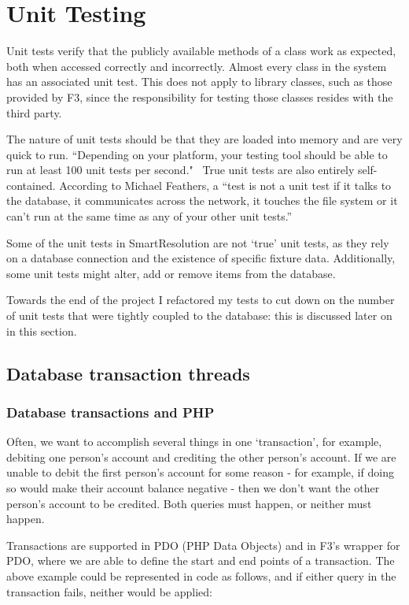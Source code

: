 \section{Unit Testing}

Unit tests verify that the publicly available methods of a class work as expected, both when accessed correctly and incorrectly. Almost every class in the system has an associated unit test. This does not apply to library classes, such as those provided by F3, since the responsibility for testing those classes resides with the third party.

The nature of unit tests should be that they are loaded into memory and are very quick to run. ``Depending on your platform, your testing tool should be able to run at least 100 unit tests per second."~\cite{artOfAgile} True unit tests are also entirely self-contained. According to Michael Feathers, a ``test is not a unit test if it talks to the database, it communicates across the network, it touches the file system or it can't run at the same time as any of your other unit tests.''~\cite{feathers:unitTests}

Some of the unit tests in SmartResolution are not `true' unit tests, as they rely on a database connection and the existence of specific fixture data. Additionally, some unit tests might alter, add or remove items from the database.

Towards the end of the project I refactored my tests to cut down on the number of unit tests that were tightly coupled to the database: this is discussed later on in this section.

\subsection{Database transaction threads}

\subsubsection{Database transactions and PHP}

Often, we want to accomplish several things in one `transaction', for example, debiting one person's account and crediting the other person's account. If we are unable to debit the first person's account for some reason - for example, if doing so would make their account balance negative - then we don't want the other person's account to be credited. Both queries must happen, or neither must happen.

Transactions are supported in PDO (PHP Data Objects) and in F3's wrapper for PDO, where we are able to define the start and end points of a transaction. The above example could be represented in code as follows, and if either query in the transaction fails, neither would be applied:

